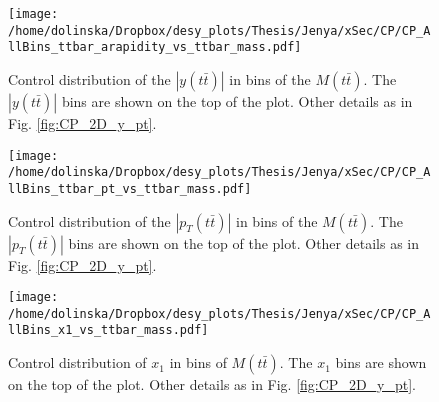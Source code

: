 \begin{figure}[H]
  \centering
  \texttt{[image: /home/dolinska/Dropbox/desy\_plots/Thesis/Jenya/xSec/CP/CP\_AllBins\_ttbar\_arapidity\_vs\_ttbar\_mass.pdf]}
  \caption{Control distribution of the $|y(t\bar{t})|$ in bins of the $M(t\bar{t})$. The $|y(t\bar{t})|$ bins are shown on the top 
  of the plot. Other details as in Fig. \ref{fig:CP_2D_y_pt}.}
  \label{fig:CP_2D_ytt_Mtt}
\end{figure}

\begin{figure}[H]
  \centering
  \texttt{[image: /home/dolinska/Dropbox/desy\_plots/Thesis/Jenya/xSec/CP/CP\_AllBins\_ttbar\_pt\_vs\_ttbar\_mass.pdf]}
  \caption{Control distribution of the $|p_{T}(t\bar{t})|$ in bins of the $M(t\bar{t})$. The $|p_{T}(t\bar{t})|$ bins are shown on the top 
  of the plot. Other details as in Fig. \ref{fig:CP_2D_y_pt}.}
  \label{fig:CP_2D_pttt_Mtt}
\end{figure}


\begin{figure}[H]
  \centering
  \texttt{[image: /home/dolinska/Dropbox/desy\_plots/Thesis/Jenya/xSec/CP/CP\_AllBins\_x1\_vs\_ttbar\_mass.pdf]}
  \caption{Control distribution of $x_{1}$ in bins of $M(t\bar{t})$. The $x_{1}$ bins are shown on the top 
  of the plot. Other details as in Fig. \ref{fig:CP_2D_y_pt}.}
  \label{fig:CP_2D_Mtt_x1}
\end{figure}



